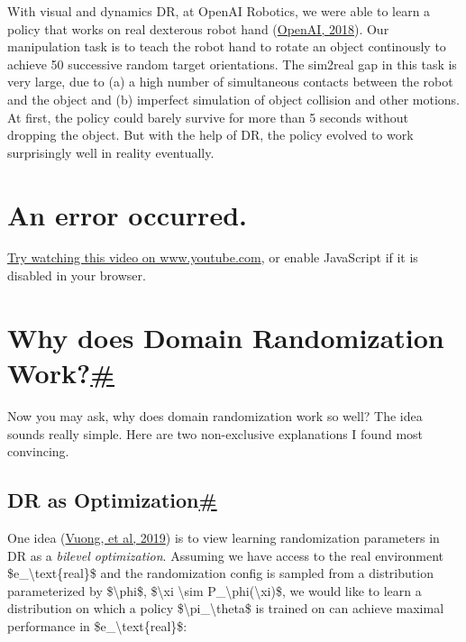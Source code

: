 With visual and dynamics DR, at OpenAI Robotics, we were able to learn a policy that works on real dexterous robot hand (\href{https://arxiv.org/abs/1808.00177}{OpenAI, 2018}). Our manipulation task is to teach the robot hand to rotate an object continously to achieve 50 successive random target orientations. The sim2real gap in this task is very large, due to (a) a high number of simultaneous contacts between the robot and the object and (b) imperfect simulation of object collision and other motions. At first, the policy could barely survive for more than 5 seconds without dropping the object. But with the help of DR, the policy evolved to work surprisingly well in reality eventually.

\label{player}

\section{An error occurred.}\label{an-error-occurred.}

\href{https://www.youtube.com/watch?v=DKe8FumoD4E}{Try watching this video on www.youtube.com}, or enable JavaScript if it is disabled in your browser.

\section{\texorpdfstring{Why does Domain Randomization Work?\hyperref[why-does-domain-randomization-work]{\#}}{Why does Domain Randomization Work?\#}}\label{why-does-domain-randomization-work}

Now you may ask, why does domain randomization work so well? The idea sounds really simple. Here are two non-exclusive explanations I found most convincing.

\subsection{\texorpdfstring{DR as Optimization\hyperref[dr-as-optimization]{\#}}{DR as Optimization\#}}\label{dr-as-optimization}

One idea (\href{https://arxiv.org/abs/1903.11774}{Vuong, et al, 2019}) is to view learning randomization parameters in DR as a \emph{bilevel optimization}. Assuming we have access to the real environment \$e\_\textbackslash text\{real\}\$ and the randomization config is sampled from a distribution parameterized by \$\textbackslash phi\$, \$\textbackslash xi \textbackslash sim P\_\textbackslash phi(\textbackslash xi)\$, we would like to learn a distribution on which a policy \$\textbackslash pi\_\textbackslash theta\$ is trained on can achieve maximal performance in \$e\_\textbackslash text\{real\}\$:

